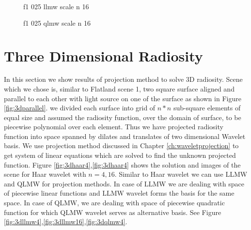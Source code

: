 \begin{figure}%
    \centering
    \qquad
    \caption{f1 025 llmw scale n 16}%
    \label{fig:f1_025_llmw_scale_plot_n_16}%
\end{figure}


\begin{figure}%
    \centering
    \qquad
    \caption{f1 025 qlmw scale n 16}%
    \label{fig:f1_025_qlmw_scale_plot_n_16}%
\end{figure}






\section{Three Dimensional Radiosity}
In this section we show results of projection method to solve 3D radiosity. Scene which we chose is, similar to Flatland scene 1, two square surface aligned and parallel to each other with light source on one of the surface as shown in Figure \ref{fig:3dparallel}. we divided each surface into grid of  $n*n$  sub-square elements of equal size and assumed the radiosity function, over the domain of surface, to be piecewise polynomial over each element. Thus we have projected radiosity function into space spanned by dilates and translates of two dimensional Wavelet basis. We use projection method discussed in Chapter \ref{ch:waveletprojection} to get system of linear equations which are solved to find the unknown projected function. Figure \ref{fig:3dhaar4},\ref{fig:3dhaar4} shows the solution and images of the scene for Haar wavelet with $n=4,16$. Similar to Haar wavelet we can use LLMW and QLMW for projection methods. In case of LLMW we are dealing with space of piecewise linear functions and LLMW wavelet forms the basis for the same space. In case of QLMW, we are dealing with space of piecewise quadratic function for which QLMW wavelet serves as alternative basis. See Figure \ref{fig:3dllmw4},\ref{fig:3dllmw16},\ref{fig:3dqlmw4}.




